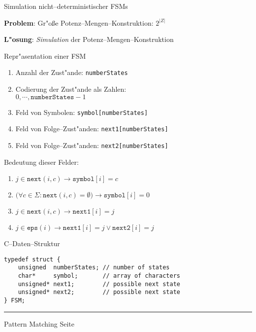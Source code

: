 \begin{slide}{}
\normalsize

\begin{center}
Simulation nicht--deterministischer FSMs
\end{center}
\vspace*{0.5cm}

\footnotesize
\textbf{Problem}: Gr"o{\ss}e  Potenz--Mengen--Konstruktion: $2^{|Z|}$

\textbf{L"osung}: \emph{Simulation} der Potenz--Mengen--Konstruktion

Repr"asentation einer FSM
\begin{enumerate}
\item Anzahl der Zust"ande: \texttt{numberStates}
\item Codierung der Zust"ande als Zahlen: \\[0.3cm]
      \hspace*{1.3cm}  $0, \cdots, \mathtt{numberStates}-1$
\item Feld von Symbolen: \texttt{symbol[numberStates]} 
\item Feld von Folge--Zust"anden: \texttt{next1[numberStates]} 
\item Feld von Folge--Zust"anden: \texttt{next2[numberStates]} 
\end{enumerate}
Bedeutung dieser Felder:
\begin{enumerate}
\item $j \in \texttt{next}(i, c) \rightarrow \mathtt{symbol}[i] = c$
\item $\bigg(\forall c \in \Sigma:  \texttt{next}(i, c) = \emptyset \bigg) \rightarrow \mathtt{symbol}[i] = 0$
\item $j \in \mathtt{next}(i,c) \rightarrow \mathtt{next1}[i] = j$
\item $j \in \mathtt{eps}(i) \rightarrow \mathtt{next1}[i] = j \vee \mathtt{next2}[i] = j$
\end{enumerate}

C--Daten--Struktur
\begin{verbatim}
typedef struct {
    unsigned  numberStates; // number of states
    char*     symbol;       // array of characters
    unsigned* next1;        // possible next state
    unsigned* next2;        // possible next state
} FSM;
\end{verbatim}


\vspace*{\fill}
\tiny \addtocounter{mypage}{1}
\rule{17cm}{1mm}
Pattern Matching \hspace*{\fill} Seite 
\end{slide}

